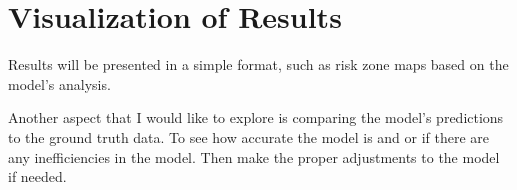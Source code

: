\documentclass{article}
\begin{document}
\section{Visualization of Results}
Results will be presented in a simple format, such as risk zone maps based on the model's analysis.

Another aspect that I would like to explore is comparing the model's predictions to the ground truth data. To see how accurate the model is and or if there are any inefficiencies in the model.
Then make the proper adjustments to the model if needed. 
\end{document}
